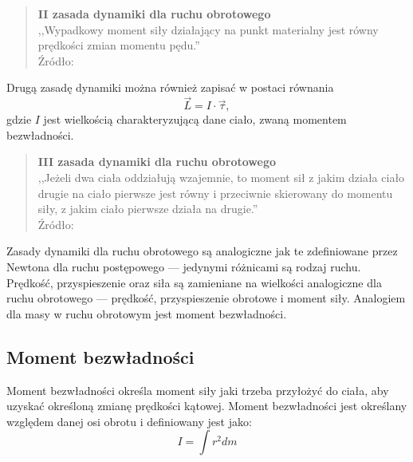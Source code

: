 \begin{quotation}
	\textbf{II zasada dynamiki dla ruchu obrotowego} \\
	,,Wypadkowy moment siły działający na punkt materialny jest równy prędkości zmian momentu pędu.''\\
	Źródło: \cite{bib:kakol}
\end{quotation}
Drugą zasadę dynamiki można również zapisać w postaci równania
\begin{equation}
\vec{L} = I \cdot \vec{\tau},
\end{equation}
gdzie $I$ jest wielkością charakteryzującą dane ciało, zwaną momentem bezwładności.

\begin{quotation}
	\textbf{III zasada dynamiki dla ruchu obrotowego}\\
	,,Jeżeli dwa ciała oddziałują wzajemnie, to moment sił z jakim działa ciało drugie na ciało pierwsze jest równy i przeciwnie skierowany do momentu siły, z jakim ciało pierwsze działa na drugie.''\\
	Źródło: \cite{bib:kakol}
\end{quotation}

Zasady dynamiki dla ruchu obrotowego są analogiczne jak te zdefiniowane przez Newtona dla ruchu postępowego --- jedynymi różnicami są rodzaj ruchu. Prędkość, przyspieszenie oraz siła  są zamieniane na wielkości analogiczne dla ruchu obrotowego --- prędkość, przyspieszenie obrotowe i moment siły. Analogiem dla masy w ruchu obrotowym jest moment bezwładności. 

\subsection{Moment bezwładności}
Moment bezwładności określa moment siły jaki trzeba przyłożyć do ciała, aby uzyskać określoną zmianę prędkości kątowej. Moment bezwładności jest określany względem danej osi obrotu i definiowany jest jako:
\begin{equation}
\label{eq:moment-bezwladnosci}
I = \int r^2 dm
\end{equation}

